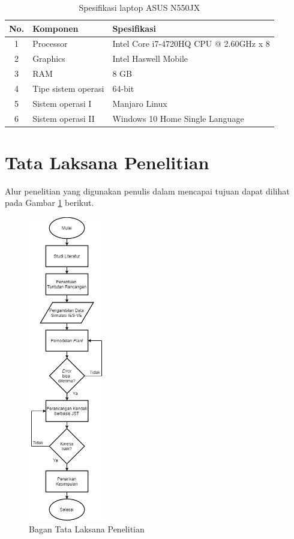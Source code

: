 \begin{table}[!h]
	\caption{Spesifikasi laptop ASUS N550JX}
	\label{tbl:4:speklaptop}
	\centering
	\begin{tabular}{|c|p{5cm}|p{8cm}|}
		\hline
		No. & Komponen & Spesifikasi \\ 
		\hline
		1 & Processor & Intel Core i7-4720HQ CPU @ 2.60GHz x 8 \\ 
		\hline
		2 & Graphics & Intel Haswell Mobile \\
		\hline
		3 & RAM & 8 GB \\ 
		\hline
		4 & Tipe sistem operasi & 64-bit \\
		\hline
		5 & Sistem operasi I & Manjaro Linux \\ 
		\hline
		6 & Sistem operasi II & Windows 10 Home Single Language \\ 
		\hline
	\end{tabular}
\end{table}

\section{Tata Laksana Penelitian}
Alur penelitian yang digunakan penulis dalam mencapai tujuan dapat dilihat pada Gambar \ref{fig:4:TataLaksanaPenelitian} berikut.
\begin{figure}[!h]
	\centering
	\includegraphics[width=0.3\textwidth]{figures/TataLaksanaPenelitian}
	\caption{Bagan Tata Laksana Penelitian}
	\label{fig:4:TataLaksanaPenelitian}
\end{figure}

